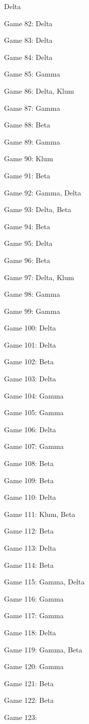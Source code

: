 \documentclass{article}
\begin{document}
\begin{multicols}{3}
\begin{compactitem}
Delta
\item Game 82:
Delta
\item Game 83:
Delta
\item Game 84:
Delta
\item Game 85:
Gamma
\item Game 86:
Delta, Klum
\item Game 87:
Gamma
\item Game 88:
Beta
\item Game 89:
Gamma
\item Game 90:
Klum
\item Game 91:
Beta
\item Game 92:
Gamma, Delta
\item Game 93:
Delta, Beta
\item Game 94:
Beta
\item Game 95:
Delta
\item Game 96:
Beta
\item Game 97:
Delta, Klum
\item Game 98:
Gamma
\item Game 99:
Gamma
\item Game 100:
Delta
\item Game 101:
Delta
\item Game 102:
Beta
\item Game 103:
Delta
\item Game 104:
Gamma
\item Game 105:
Gamma
\item Game 106:
Delta
\item Game 107:
Gamma
\item Game 108:
Beta
\item Game 109:
Beta
\item Game 110:
Delta
\item Game 111:
Klum, Beta
\item Game 112:
Beta
\item Game 113:
Delta
\item Game 114:
Beta
\item Game 115:
Gamma, Delta
\item Game 116:
Gamma
\item Game 117:
Gamma
\item Game 118:
Delta
\item Game 119:
Gamma, Beta
\item Game 120:
Gamma
\item Game 121:
Beta
\item Game 122:
Beta
\item Game 123:

\end{compactitem}
\end{multicols}
\end{document}
